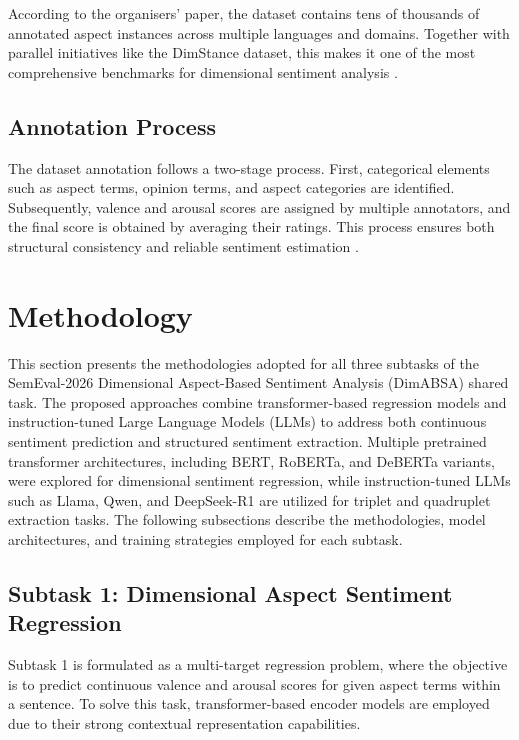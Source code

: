 \documentclass{article}
\begin{document}
According to the organisers' paper, the dataset contains tens of thousands of annotated aspect instances across multiple languages and domains. Together with parallel initiatives like the DimStance dataset, this makes it one of the most comprehensive benchmarks for dimensional sentiment analysis \cite{lee2026dimabsabuildingmultilingualmultidomain}.

\subsection{Annotation Process}

The dataset annotation follows a two-stage process. First, categorical elements such as aspect terms, opinion terms, and aspect categories are identified. Subsequently, valence and arousal scores are assigned by multiple annotators, and the final score is obtained by averaging their ratings. This process ensures both structural consistency and reliable sentiment estimation \cite{lee2026dimabsabuildingmultilingualmultidomain}.

\section{Methodology}
\label{sec:methodology}

This section presents the methodologies adopted for all three subtasks of the SemEval-2026 Dimensional Aspect-Based Sentiment Analysis (DimABSA) shared task. The proposed approaches combine transformer-based regression models and instruction-tuned Large Language Models (LLMs) to address both continuous sentiment prediction and structured sentiment extraction. Multiple pretrained transformer architectures, including BERT, RoBERTa, and DeBERTa variants, were explored for dimensional sentiment regression, while instruction-tuned LLMs such as Llama, Qwen, and DeepSeek-R1 are utilized for triplet and quadruplet extraction tasks. The following subsections describe the methodologies, model architectures, and training strategies employed for each subtask.

\subsection{Subtask 1: Dimensional Aspect Sentiment Regression}

Subtask 1 is formulated as a multi-target regression problem, where the objective is to predict continuous valence and arousal scores for given aspect terms within a sentence. To solve this task, transformer-based encoder models are employed due to their strong contextual representation capabilities.
\end{document}
